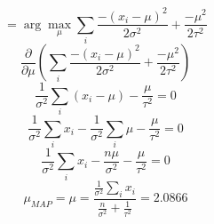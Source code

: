 \documentclass[submit]{harvardml}
\begin{document}
\begin{enumerate}
\begin{equation*}
     \end{equation*}
     \begin{equation*}
     = \arg\max_{\mu} \sum_{i} \frac{-(x_i -\mu)^2}{2\sigma^2}  + \frac{-\mu^2}{2\tau^2}
     \end{equation*}
     \begin{equation*}
     \frac{\partial}{\partial \mu}(\sum_{i} \frac{-(x_i -\mu)^2}{2\sigma^2}  + \frac{-\mu^2}{2\tau^2})
     \end{equation*}
     \begin{equation*}
     \frac{1}{\sigma^2}\sum_{i} (x_i -\mu)  - \frac{\mu}{\tau^2} = 0
     \end{equation*}
     \begin{equation*}
     \frac{1}{\sigma^2}\sum_{i} x_i - \frac{1}{\sigma^2}\sum_{i} \mu  - \frac{\mu}{\tau^2} = 0
     \end{equation*}
     \begin{equation*}
     \frac{1}{\sigma^2}\sum_{i} x_i - \frac{n\mu}{\sigma^2}  - \frac{\mu}{\tau^2} = 0
     \end{equation*}
     \begin{equation*}
     \mu_{MAP} = \mu = \frac{\frac{1}{\sigma^2}\sum_{i} x_i}{\frac{n}{\sigma^2}  + \frac{1}{\tau^2}} = 2.0866
     \end{equation*}
     

\end{enumerate}
\end{document}
